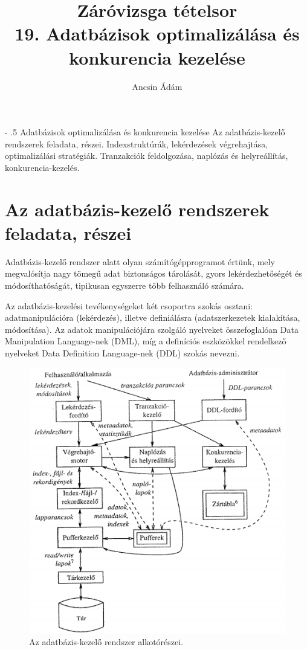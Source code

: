 \documentclass[margin=0px]{article}
\title{Záróvizsga tételsor \\ \large 19. Adatbázisok optimalizálása és konkurencia kezelése}
\date{}
\author{Ancsin Ádám}
\makeatletter
\renewcommand\paragraph{%
	\@startsection{paragraph}{4}{0mm}%
	{-\baselineskip}%
	{.5\baselineskip}%
	{\normalfont\normalsize\bfseries}}
\newenvironment{tetel}[1]{\paragraph{#1}}{}
\makeatother
\begin{document}
	\maketitle
	
	\begin{tetel}{Adatbázisok optimalizálása és konkurencia kezelése}
			Az adatbázis-kezelő rendszerek feladata, részei. Indexstruktúrák, lekérdezések végrehajtása, optimalizálási stratégiák. Tranzakciók feldolgozása, naplózás és helyreállítás, konkurencia-kezelés.
	\end{tetel}
	
	
	\section{Az adatbázis-kezelő rendszerek feladata, részei}
	
	Adatbázis-kezelő rendszer alatt olyan számítógépprogramot értünk, mely megvalósítja nagy tömegű adat biztonságos
	tárolását, gyors lekérdezhetőségét és módosíthatóságát, tipikusan egyszerre	több felhasználó számára.
	
	Az adatbázis-kezelési tevékenységeket két csoportra szokás osztani: adatmanipulációra (lekérdezés),
	illetve definiálásra (adatszerkezetek kialakítása, módosítása). Az adatok manipulációjára szolgáló nyelveket összefoglalóan
	Data Manipulation Language-nek (DML), míg a definíciós eszközökkel rendelkező nyelveket Data Definition Language-nek (DDL)
	szokás nevezni.
	
	\begin{figure}[H]
		\centering
		\includegraphics[width=0.7\linewidth]{img/db_felepites}
		\caption{Az adatbázis-kezelő rendszer alkotórészei.}
		\label{fig:db_felepites}
	\end{figure}
	
\end{document}
